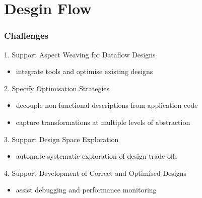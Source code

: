 \section{Desgin Flow}
\begin{frame}
  \frametitle{Challenges}

  \begin{beamerboxesrounded}{1. Support Aspect Weaving for Dataflow Designs}
    \begin{itemize}
    \item integrate tools and optimise existing designs
    \end{itemize}
  \end{beamerboxesrounded}

  \begin{beamerboxesrounded}{2. Specify Optimisation Strategies}
    \begin{itemize}
    \item decouple non-functional descriptions from application code
    \item capture transformations at multiple levels of abstraction
    \end{itemize}
  \end{beamerboxesrounded}

  \begin{beamerboxesrounded}{3. Support Design Space Exploration}
    \begin{itemize}
    \item automate systematic exploration of design trade-offs
    \end{itemize}
  \end{beamerboxesrounded}
  \begin{beamerboxesrounded}{4. Support Development of Correct and Optimised Designs}
    \begin{itemize}
    \item assist debugging and performance monitoring
    \end{itemize}
  \end{beamerboxesrounded}
\end{frame}

